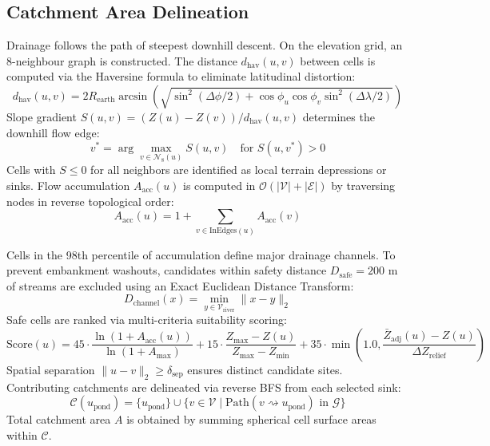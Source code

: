 \documentclass[manuscript,screen,review]{acmart}
\begin{document}
\subsection{Catchment Area Delineation}
Drainage follows the path of steepest downhill descent. On the elevation grid, an 8-neighbour graph is constructed. The distance $d_{\text{hav}}(u, v)$ between cells is computed via the Haversine formula to eliminate latitudinal distortion:
\begin{equation}
d_{\text{hav}}(u, v) = 2 R_{\text{earth}} \arcsin \left( \sqrt{\sin^2(\Delta \phi / 2) + \cos \phi_u \cos \phi_v \sin^2(\Delta \lambda / 2)} \right)
\end{equation}
Slope gradient $S(u, v) = (Z(u) - Z(v)) / d_{\text{hav}}(u, v)$ determines the downhill flow edge:
\begin{equation}
v^* = \arg\max_{v \in \mathcal{N}_8(u)} S(u, v) \quad \text{for } S(u, v^*) > 0
\end{equation}
Cells with $S \le 0$ for all neighbors are identified as local terrain depressions or sinks. Flow accumulation $A_{\text{acc}}(u)$ is computed in $\mathcal{O}(|\mathcal{V}| + |\mathcal{E}|)$ by traversing nodes in reverse topological order:
\begin{equation}
A_{\text{acc}}(u) = 1 + \sum_{v \in \text{InEdges}(u)} A_{\text{acc}}(v)
\end{equation}

Cells in the 98th percentile of accumulation define major drainage channels. To prevent embankment washouts, candidates within safety distance $D_{\text{safe}} = 200\text{ m}$ of streams are excluded using an Exact Euclidean Distance Transform:
\begin{equation}
D_{\text{channel}}(x) = \min_{y \in \mathcal{V}_{\text{river}}} \|x - y\|_2
\end{equation}
Safe cells are ranked via multi-criteria suitability scoring:
\begin{equation}
\text{Score}(u) = 45 \cdot \frac{\ln(1 + A_{\text{acc}}(u))}{\ln(1 + A_{\max})} + 15 \cdot \frac{Z_{\max} - Z(u)}{Z_{\max} - Z_{\min}} + 35 \cdot \min\left(1.0, \frac{\bar{Z}_{\text{adj}}(u) - Z(u)}{\Delta Z_{\text{relief}}}\right)
\end{equation}
Spatial separation $\|u - v\|_2 \ge \delta_{\text{sep}}$ ensures distinct candidate sites. Contributing catchments are delineated via reverse BFS from each selected sink:
\begin{equation}
\mathcal{C}(u_{\text{pond}}) = \{u_{\text{pond}}\} \cup \{v \in \mathcal{V} \mid \text{Path}(v \rightsquigarrow u_{\text{pond}}) \text{ in } \mathcal{G}\}
\end{equation}
Total catchment area $A$ is obtained by summing spherical cell surface areas within $\mathcal{C}$.
\end{document}
